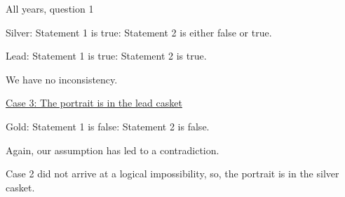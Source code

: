 \begin{MyInnerBox}{All years, question 1}
{\begin{MySolutionBox}
        \hspace{1em}Silver: Statement 1 is true: Statement 2 is either false or true.\par
        \hspace{1em}Lead: \;Statement 1 is true: Statement 2 is true.\par
        We have no inconsistency.\par\medskip
        \underline{Case 3: The portrait is in the lead casket}\par
        \hspace{1em}Gold: \;Statement 1 is false: Statement 2 is false.\par
        Again, our assumption has led to a contradiction.\par\medskip
        Case 2 did not arrive at a logical impossibility, so, the portrait is in the silver casket.\par\medskip
      \end{MySolutionBox}
    }{}%
    \end{MyInnerBox}

